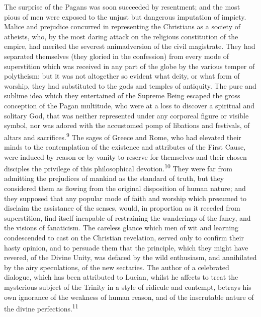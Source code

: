 

The surprise of the Pagans was soon succeeded by resentment; and
the most pious of men were exposed to the unjust but dangerous
imputation of impiety. Malice and prejudice concurred in
representing the Christians as a society of atheists, who, by the
most daring attack on the religious constitution of the empire,
had merited the severest animadversion of the civil magistrate.
They had separated themselves (they gloried in the confession)
from every mode of superstition which was received in any part of
the globe by the various temper of polytheism: but it was not
altogether so evident what deity, or what form of worship, they
had substituted to the gods and temples of antiquity. The pure
and sublime idea which they entertained of the Supreme Being
escaped the gross conception of the Pagan multitude, who were at
a loss to discover a spiritual and solitary God, that was neither
represented under any corporeal figure or visible symbol, nor was
adored with the accustomed pomp of libations and festivals, of
altars and sacrifices.\textsuperscript{9} The sages of Greece and Rome, who had
elevated their minds to the contemplation of the existence and
attributes of the First Cause, were induced by reason or by
vanity to reserve for themselves and their chosen disciples the
privilege of this philosophical devotion.\textsuperscript{10} They were far from
admitting the prejudices of mankind as the standard of truth, but
they considered them as flowing from the original disposition of
human nature; and they supposed that any popular mode of faith
and worship which presumed to disclaim the assistance of the
senses, would, in proportion as it receded from superstition,
find itself incapable of restraining the wanderings of the fancy,
and the visions of fanaticism. The careless glance which men of
wit and learning condescended to cast on the Christian
revelation, served only to confirm their hasty opinion, and to
persuade them that the principle, which they might have revered,
of the Divine Unity, was defaced by the wild enthusiasm, and
annihilated by the airy speculations, of the new sectaries. The
author of a celebrated dialogue, which has been attributed to
Lucian, whilst he affects to treat the mysterious subject of the
Trinity in a style of ridicule and contempt, betrays his own
ignorance of the weakness of human reason, and of the inscrutable
nature of the divine perfections.\textsuperscript{11}

